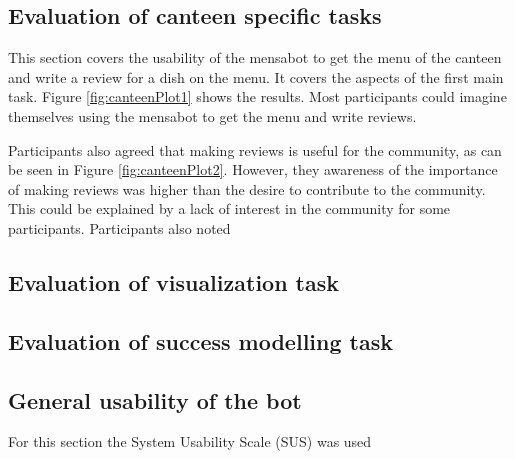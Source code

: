 \subsection{Evaluation of canteen specific tasks}  
This section covers the usability of the mensabot to get the menu of the canteen and write a review for a dish on the menu. It covers the aspects of the first main task. Figure \ref{fig:canteenPlot1} shows the results. Most participants could imagine themselves using the mensabot to get the menu and write reviews.
 
Participants also agreed that making reviews is useful for the community, as can be seen in Figure \ref{fig:canteenPlot2}. 
However, they awareness of the importance of making reviews was higher than the desire to contribute to the community. This could be explained by a lack of interest in the community for some participants. Participants also noted 

\subsection{Evaluation of visualization task}

\subsection{Evaluation of success modelling task}

\subsection{General usability of the bot}
For this section the System Usability Scale (SUS) was used